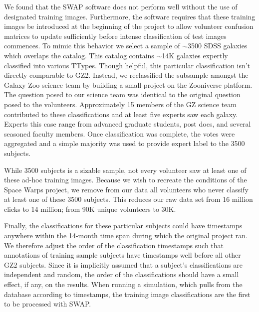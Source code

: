 \documentclass[twocolumn]{aastex6}
\begin{document}
We found that the SWAP software does not perform well without the use of designated 
training images. Furthermore, the software requires that these training images
be introduced at the beginning of the project to allow volunteer confusion matrices
to update sufficiently before intense classification of test images commences. 
To mimic this behavior we select a sample of $\sim$3500 SDSS galaxies which 
overlaps the \cite{NairAbraham2010} catalog. This catalog contains $\sim$14K 
galaxies expertly classified into various TTypes. Though helpful, this particular
classification isn't directly comparable to GZ2.   Instead, we reclassified the subsample 
amongst the Galaxy Zoo science team by building a small project on the Zooniverse
platform. The question posed to our science team was identical to the original 
question posed to the volunteers. Approximately 15 members of the GZ science team
contributed to these classifications and at least five experts saw each galaxy. Experts 
this case range from advanced graduate students, post docs, and several 
seasoned faculty members. Once
classification was complete, the votes were aggregated and a simple majority was 
used to provide expert label  to the 3500 subjects. 

While 3500 subjects is a sizable sample, not  every volunteer saw at least 
one of these ad-hoc training images. Because we wish to recreate the conditions 
of the Space Warps project, we remove from our data all volunteers who never 
classify at least one of these 3500 subjects. This reduces our raw data set from
16 million clicks to 14 million; from 90K unique volunteers to 30K. 

Finally, the classifications for these particular subjects could 
have timestamps anywhere within the 14-month time span during which the original project ran.
We therefore adjust the order of the classification timestamps such that 
annotations of training sample subjects
have timestamps well before all other GZ2 subjects. Since it is implicitly assumed
that a subject's classifications are independent and random, the order of the 
classifications should have a small effect, if any, on the results.  
When running a simulation, which pulls from the database according to timestamps,
the training image classifications are the first to be processed with SWAP.  
\end{document}
